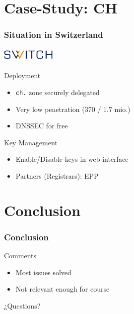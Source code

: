 \documentclass{beamer}
\begin{document}
\section{Case-Study: CH}

\begin{frame}
  \frametitle{Situation in Switzerland}
  \framesubtitle{\includegraphics[width=2.6cm]{SWITCH-logo}}

  \begin{block}{Deployment}
    \begin{itemize}
    \item \texttt{ch.} zone securely delegated
    \item Very low penetration (370 / 1.7 mio.)
    \item DNSSEC for free
    \end{itemize}
  \end{block}

  \pause

  \begin{block}{Key Management}
    \begin{itemize}
    \item Enable/Disable keys in web-interface
    \item Partners (Registrars): EPP
    \end{itemize}
  \end{block}
\end{frame}

\section{Conclusion}

\begin{frame}
  \frametitle{Conclusion}
  
  \begin{block}{Comments}
    \begin{itemize}
    \item Most issues solved
    \item Not relevant enough for course
    \end{itemize}
  \end{block}

  \pause

  \begin{block}{¿Questions?}
  \end{block}
  
\end{frame}
\end{document}
